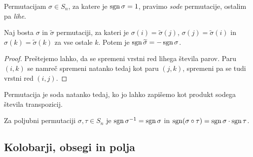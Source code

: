 \documentclass[12pt, a4paper]{article}
\begin{document}
\begin{definicija}
Permutacijam $\sigma\in S_n$, za katere je $\operatorname{sgn}\sigma=1$, pravimo \emph{sode} permutacije, ostalim pa \emph{lihe}.
\end{definicija}

\begin{trditev}
Naj bosta $\sigma$ in $\widetilde{\sigma}$ permutaciji, za kateri je $\sigma(i)=\widetilde{\sigma}(j)$, $\sigma(j)=\widetilde{\sigma}(i)$ in $\sigma(k)=\widetilde{\sigma}(k)$ za vse ostale $k$. Potem je $\operatorname{sgn}\widetilde{\sigma}=-\operatorname{sgn}\sigma$.
\end{trditev}

\begin{proof}
Preštejemo lahko, da se spremeni vrstni red lihega števila parov. Paru $(i,k)$ se namreč spremeni natanko tedaj kot paru $(j,k)$, spremeni pa se tudi vrstni red $(i,j)$.
\end{proof}

\begin{posledica}
Permutacija je soda natanko tedaj, ko jo lahko zapišemo kot produkt sodega števila transpozicij.
\end{posledica}

\begin{posledica}
Za poljubni permutaciji $\sigma,\tau\in S_n$ je $\operatorname{sgn}\sigma^{-1}=\operatorname{sgn}\sigma$ in $\operatorname{sgn}(\sigma\circ\tau)=\operatorname{sgn}\sigma\cdot\operatorname{sgn}\tau$.
\end{posledica}

\newpage

\subsection{Kolobarji, obsegi in polja}
\end{document}
